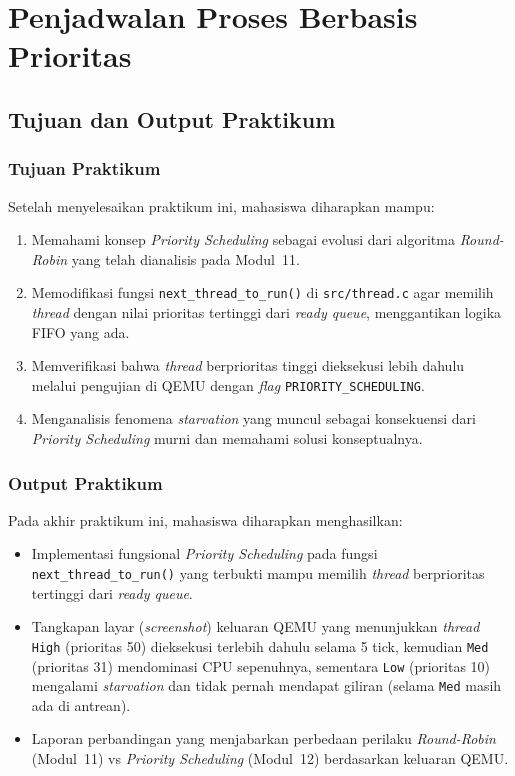 
\chapter{Penjadwalan Proses Berbasis Prioritas}
\label{chap:modul-12}

\sloppy

\section{Tujuan dan Output Praktikum}

\subsection{Tujuan Praktikum}
Setelah menyelesaikan praktikum ini, mahasiswa diharapkan mampu:
\begin{enumerate}
	\item Memahami konsep \textit{Priority Scheduling} sebagai evolusi dari algoritma \textit{Round-Robin} yang telah dianalisis pada Modul~11.
	\item Memodifikasi fungsi \texttt{next\_thread\_to\_run()} di \texttt{src/thread.c} agar memilih \textit{thread} dengan nilai prioritas tertinggi dari \textit{ready queue}, menggantikan logika FIFO yang ada.
	\item Memverifikasi bahwa \textit{thread} berprioritas tinggi dieksekusi lebih dahulu melalui pengujian di QEMU dengan \textit{flag} \texttt{PRIORITY\_SCHEDULING}.
	\item Menganalisis fenomena \textit{starvation} yang muncul sebagai konsekuensi dari \textit{Priority Scheduling} murni dan memahami solusi konseptualnya.
\end{enumerate}

\subsection{Output Praktikum}
Pada akhir praktikum ini, mahasiswa diharapkan menghasilkan:
\begin{itemize}
	\item Implementasi fungsional \textit{Priority Scheduling} pada fungsi \texttt{next\_thread\_to\_run()} yang terbukti mampu memilih \textit{thread} berprioritas tertinggi dari \textit{ready queue}.
	\item Tangkapan layar (\textit{screenshot}) keluaran QEMU yang menunjukkan \textit{thread} \texttt{High} (prioritas 50) dieksekusi terlebih dahulu selama 5 tick, kemudian \texttt{Med} (prioritas 31) mendominasi CPU sepenuhnya, sementara \texttt{Low} (prioritas 10) mengalami \textit{starvation} dan tidak pernah mendapat giliran (selama \texttt{Med} masih ada di antrean).
	\item Laporan perbandingan yang menjabarkan perbedaan perilaku \textit{Round-Robin} (Modul~11) vs \textit{Priority Scheduling} (Modul~12) berdasarkan keluaran QEMU.
\end{itemize}


